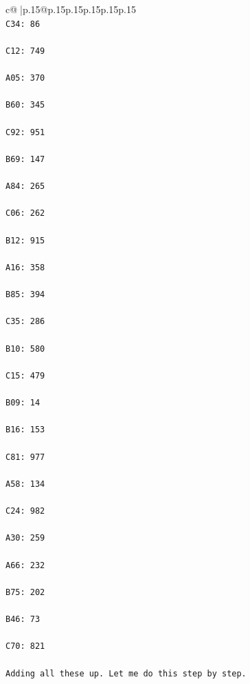 \documentclass{article}
\begin{document}
{\begin{supertabular}{c@{$\;$}|p{.15\linewidth}@{}p{.15\linewidth}p{.15\linewidth}p{.15\linewidth}p{.15\linewidth}p{.15\linewidth}}
{{{\\ 
\texttt{C34: 86} \\
\\ 
\texttt{C12: 749} \\
\\ 
\texttt{A05: 370} \\
\\ 
\texttt{B60: 345} \\
\\ 
\texttt{C92: 951} \\
\\ 
\texttt{B69: 147} \\
\\ 
\texttt{A84: 265} \\
\\ 
\texttt{C06: 262} \\
\\ 
\texttt{B12: 915} \\
\\ 
\texttt{A16: 358} \\
\\ 
\texttt{B85: 394} \\
\\ 
\texttt{C35: 286} \\
\\ 
\texttt{B10: 580} \\
\\ 
\texttt{C15: 479} \\
\\ 
\texttt{B09: 14} \\
\\ 
\texttt{B16: 153} \\
\\ 
\texttt{C81: 977} \\
\\ 
\texttt{A58: 134} \\
\\ 
\texttt{C24: 982} \\
\\ 
\texttt{A30: 259} \\
\\ 
\texttt{A66: 232} \\
\\ 
\texttt{B75: 202} \\
\\ 
\texttt{B46: 73} \\
\\ 
\texttt{C70: 821} \\
\\ 
\texttt{Adding all these up. Let me do this step by step.} \\
}}}
\end{supertabular}}
\end{document}

